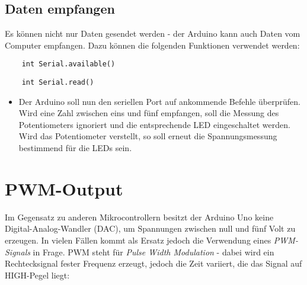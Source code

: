 \documentclass[10pt,a4paper]{article}
\begin{document}
\subsection{Daten empfangen}
Es können nicht nur Daten gesendet werden - der Arduino kann auch Daten vom Computer empfangen. Dazu können die folgenden Funktionen verwendet werden:

\begin{lstlisting}
	int Serial.available()
\end{lstlisting}
\begin{lstlisting}
	int Serial.read()
\end{lstlisting}

\begin{itemize}
	\item Der Arduino soll nun den seriellen Port auf ankommende Befehle überprüfen. Wird eine Zahl zwischen eins und fünf empfangen, soll die Messung des Potentiometers ignoriert und die entsprechende LED eingeschaltet werden. Wird das Potentiometer verstellt, so soll erneut die Spannungsmessung bestimmend für die LEDs sein.
\end{itemize}





\clearpage
\section{PWM-Output}
Im Gegensatz zu anderen Mikrocontrollern besitzt der Arduino Uno keine Digital-Analog-Wandler (DAC), um Spannungen zwischen null und fünf Volt zu erzeugen. In vielen Fällen kommt als Ersatz jedoch die Verwendung eines \emph{PWM-Signals} in Frage. PWM steht für \emph{Pulse Width Modulation} - dabei wird ein Rechtecksignal fester Frequenz erzeugt, jedoch die Zeit variiert, die das Signal auf HIGH-Pegel liegt:
\end{document}
